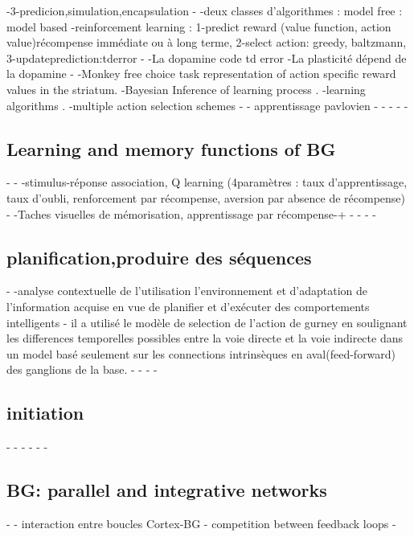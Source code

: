 -3-predicion,simulation,encapsulation
-\citep{doya 2007}
-deux classes d'algorithmes : model free : model based
-reinforcement learning : 1-predict reward (value function, action value)récompense immédiate ou à long terme, 2-select action: greedy, baltzmann, 3-updateprediction:tderror
-
-La dopamine code td error\citep{Schultz:1997}
-La plasticité dépend de la dopamine \citep{wickebs:1995}
-
-Monkey free choice task \citep{Samejima 2005} representation of action specific reward values in the striatum.
-Bayesian Inference of learning process \citep{Samejima 2004}.
-learning algorithms \citep{doya 1999}.
-multiple action selection schemes\citep{doya 1994}
-
-\citep{C.Oreilly J.Frank} apprentissage pavlovien
-
-
-
-%
-\subsection{Learning and memory functions of BG}
-
-\citep{Packard}
-stimulus-réponse association, Q learning (4paramètres : taux d'apprentissage, taux d'oubli, renforcement par récompense, aversion par absence de récompense)
-\citep{Hamker,memory retrieval in rewarded visual tasks}
-Taches visuelles de mémorisation, apprentissage par récompense-+
-
-%
-
-\subsection{planification,produire des séquences}
-
-\citep{houk 1995}analyse contextuelle de l'utilisation l'environnement et d'adaptation de l'information acquise en vue de planifier et d'exécuter des comportements intelligents 
-\citep{Berns} il a utilisé le modèle de selection de l'action de gurney en soulignant les differences temporelles possibles entre la voie directe et la voie indirecte dans un model basé seulement sur les connections intrinsèques en aval(feed-forward) des ganglions de la base.
-
-%
-
-\subsection{initiation}
-
-%
-
-%
-
-\subsection{BG: parallel and integrative networks}
-
-\citep {Haber} interaction entre boucles Cortex-BG 
-\citep{leblois} competition between feedback loops 
-
 



